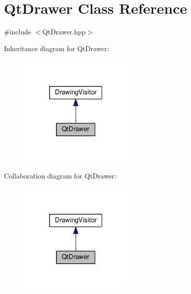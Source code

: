 \hypertarget{class_qt_drawer}{}\section{Qt\+Drawer Class Reference}
\label{class_qt_drawer}


{\ttfamily \#include $<$Qt\+Drawer.\+hpp$>$}



Inheritance diagram for Qt\+Drawer\+:\nopagebreak
\begin{figure}[H]
\begin{center}
\leavevmode
\includegraphics[width=160pt]{class_qt_drawer__inherit__graph}
\end{center}
\end{figure}


Collaboration diagram for Qt\+Drawer\+:\nopagebreak
\begin{figure}[H]
\begin{center}
\leavevmode
\includegraphics[width=160pt]{class_qt_drawer__coll__graph}
\end{center}
\end{figure}
